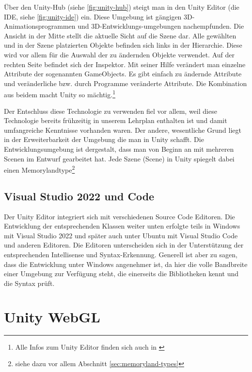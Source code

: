 Über den Unity-Hub (siehe \ref{fig:unity-hub}) steigt man in den Unity Editor (die IDE, siehe \ref{fig:unity-ide}) ein. Diese Umgebung ist gängigen 3D-Animationsprogrammen und 3D-Entwicklungs-umgebungen nachempfunden. Die Ansicht in der Mitte stellt die aktuelle Sicht auf die Szene dar. Alle gewählten und in der Szene platzierten Objekte befinden sich links in der Hierarchie. Diese wird vor allem für die Auswahl der zu ändernden Objekte verwendet. Auf der rechten Seite befindet sich der Inspektor. Mit seiner Hilfe verändert man einzelne Attribute der sogenannten GameObjects. Es gibt einfach zu ändernde Attribute und veränderliche bzw. durch Programme veränderte Attribute. Die Kombination aus beidem macht Unity so mächtig.\footnote{Alle Infos zum Unity Editor finden sich auch in \cite{UnityDocsEditor}}


Der Entschluss diese Technologie zu verwenden fiel vor allem, weil diese Technologie bereits frühzeitig in unserem Lehrplan enthalten ist und damit umfangreiche Kenntnisse vorhanden waren. Der andere, wesentliche Grund liegt in der Erweiterbarkeit der Umgebung die man in Unity schafft. Die Entwicklungsumgebung ist dergestalt, dass man von Beginn an mit mehreren Scenen im Entwurf gearbeitet hat. Jede Szene (Scene) in Unity spiegelt dabei einen Memorylandtype\footnote{siehe dazu vor allem Abschnitt \ref{sec:memoryland-types}}



\subsection{Visual Studio 2022 und Code}

Der Unity Editor integriert sich mit verschiedenen Source Code Editoren. Die Entwicklung der entsprechenden Klassen weiter unten erfolgte teils in Windows mit Visual Studio 2022 und später auch unter Ubuntu mit Visual Studio Code und anderen Editoren. Die Editoren unterscheiden sich in der Unterstützung der entsprechenden Intellisense und Syntax-Erkennung. Generell ist aber zu sagen, dass die Entwicklung unter Windows angenehmer ist, da hier die volle Bandbreite einer Umgebung zur Verfügung steht, die einerseits die Bibliotheken kennt und die Syntax prüft.



\section{Unity WebGL}
\label{sec:unity-webgl}

